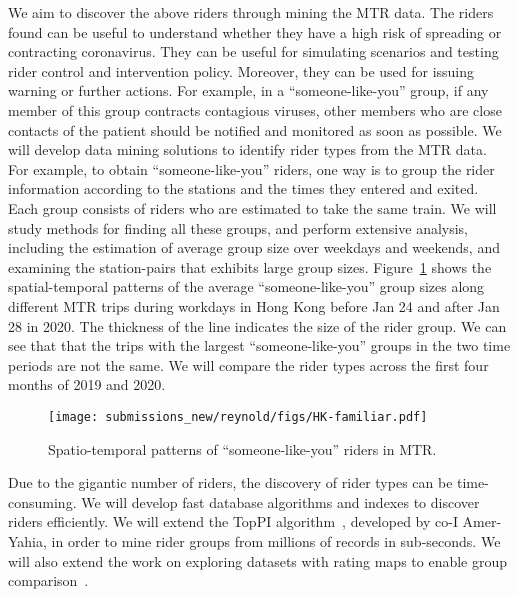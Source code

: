 \documentclass[11pt]{article}
\begin{document}
We aim to discover the above riders through mining the MTR data. The riders found can be useful to understand whether they have a high risk of spreading or contracting coronavirus.  They can be useful for simulating scenarios and testing rider control and intervention policy. Moreover, they can be used for issuing warning or further actions. For example, in a ``someone-like-you'' group, if any member of this group contracts contagious viruses, other members who are close contacts of the patient should be notified and monitored as soon as possible.  We will develop data mining solutions to identify rider types from the MTR data. For example, to obtain ``someone-like-you'' riders, one way is to group the rider information according to the stations and the times they entered and exited. Each group consists of riders who are estimated to take the same train.  
We will study methods for finding all these groups, and perform extensive analysis, including the estimation of average group size over weekdays and weekends, and examining the station-pairs that exhibits large group sizes.  Figure~\ref{fig:HK-familiar} shows the  spatial-temporal patterns of the average ``someone-like-you'' group sizes along different MTR trips during workdays in Hong Kong before Jan 24 and after Jan 28 in 2020. The thickness of the line indicates the size of the rider group. We can see that that the trips with the largest ``someone-like-you'' groups in the two time periods are not the same. We will compare the rider types across the first four months of 2019 and 2020. 

\begin{figure}[!hbt]
	\centering
	\texttt{[image: submissions\_new/reynold/figs/HK-familiar.pdf]}
	\caption{Spatio-temporal patterns of ``someone-like-you'' riders in MTR. }
	\label{fig:HK-familiar}
\end{figure}


Due to the gigantic number of riders, the discovery of rider types can be time-consuming. We will develop fast database algorithms and indexes to discover riders efficiently. We will  extend the TopPI algorithm~\cite{DBLP:journals/is/LeroyKTA17}, developed by co-I Amer-Yahia, in order to mine rider groups from millions of records in sub-seconds. We will also extend the work on exploring datasets with rating maps to enable group comparison~\cite{DBLP:conf/www/Amer-YahiaKKLZ17}.
\end{document}

